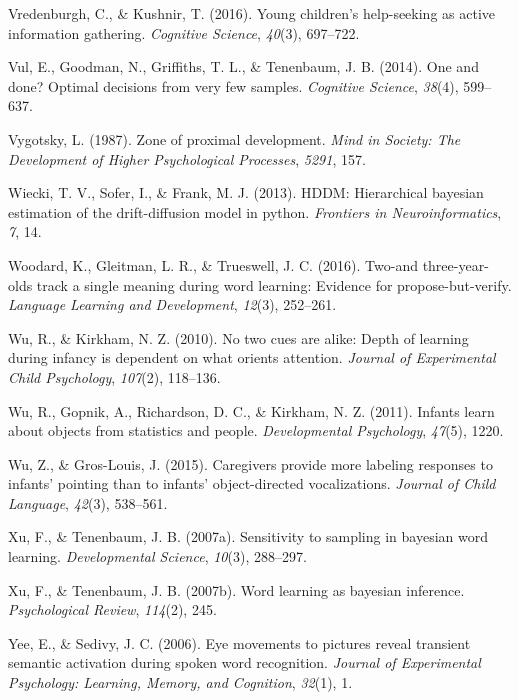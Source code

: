 \documentclass[oneside]{report}
\begin{document}
\hypertarget{ref-vredenburgh2016young}{}
Vredenburgh, C., \& Kushnir, T. (2016). Young children's help-seeking as
active information gathering. \emph{Cognitive Science}, \emph{40}(3),
697--722.

\hypertarget{ref-vul2014}{}
Vul, E., Goodman, N., Griffiths, T. L., \& Tenenbaum, J. B. (2014). One
and done? Optimal decisions from very few samples. \emph{Cognitive
Science}, \emph{38}(4), 599--637.

\hypertarget{ref-vygotsky1987zone}{}
Vygotsky, L. (1987). Zone of proximal development. \emph{Mind in
Society: The Development of Higher Psychological Processes},
\emph{5291}, 157.

\hypertarget{ref-wiecki2013hddm}{}
Wiecki, T. V., Sofer, I., \& Frank, M. J. (2013). HDDM: Hierarchical
bayesian estimation of the drift-diffusion model in python.
\emph{Frontiers in Neuroinformatics}, \emph{7}, 14.

\hypertarget{ref-woodard2016two}{}
Woodard, K., Gleitman, L. R., \& Trueswell, J. C. (2016). Two-and
three-year-olds track a single meaning during word learning: Evidence
for propose-but-verify. \emph{Language Learning and Development},
\emph{12}(3), 252--261.

\hypertarget{ref-wu2010no}{}
Wu, R., \& Kirkham, N. Z. (2010). No two cues are alike: Depth of
learning during infancy is dependent on what orients attention.
\emph{Journal of Experimental Child Psychology}, \emph{107}(2),
118--136.

\hypertarget{ref-wu2011infants}{}
Wu, R., Gopnik, A., Richardson, D. C., \& Kirkham, N. Z. (2011). Infants
learn about objects from statistics and people. \emph{Developmental
Psychology}, \emph{47}(5), 1220.

\hypertarget{ref-wu2015caregivers}{}
Wu, Z., \& Gros-Louis, J. (2015). Caregivers provide more labeling
responses to infants' pointing than to infants' object-directed
vocalizations. \emph{Journal of Child Language}, \emph{42}(3), 538--561.

\hypertarget{ref-xu2007sampling}{}
Xu, F., \& Tenenbaum, J. B. (2007a). Sensitivity to sampling in bayesian
word learning. \emph{Developmental Science}, \emph{10}(3), 288--297.

\hypertarget{ref-xu2007word}{}
Xu, F., \& Tenenbaum, J. B. (2007b). Word learning as bayesian
inference. \emph{Psychological Review}, \emph{114}(2), 245.

\hypertarget{ref-yee2006eye}{}
Yee, E., \& Sedivy, J. C. (2006). Eye movements to pictures reveal
transient semantic activation during spoken word recognition.
\emph{Journal of Experimental Psychology: Learning, Memory, and
Cognition}, \emph{32}(1), 1.
\end{document}
